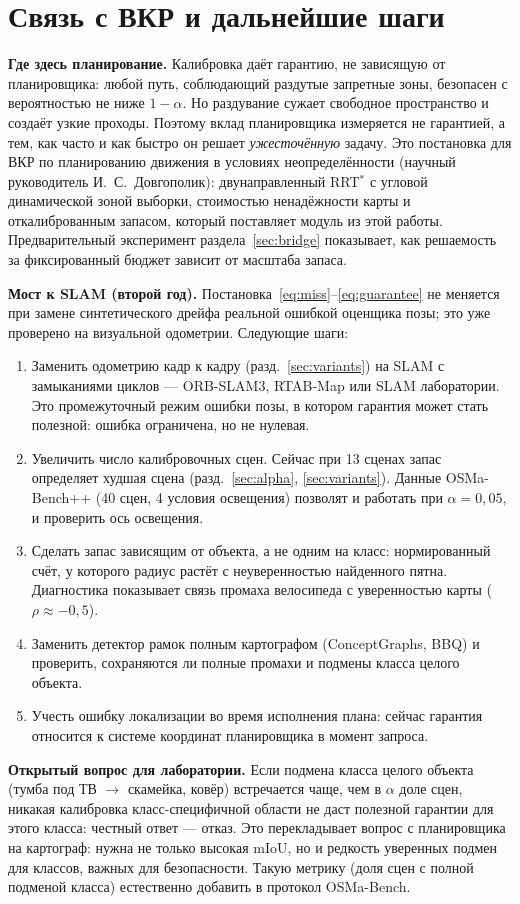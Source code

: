 \section{Связь с ВКР и дальнейшие шаги}

\textbf{Где здесь планирование.} Калибровка даёт гарантию, не зависящую от планировщика: любой путь, соблюдающий раздутые запретные зоны, безопасен с вероятностью не ниже $1-\alpha$. Но раздувание сужает свободное пространство и создаёт узкие проходы. Поэтому вклад планировщика измеряется не гарантией, а тем, как часто и как быстро он решает \emph{ужесточённую} задачу. Это постановка для ВКР по планированию движения в условиях неопределённости (научный руководитель И.~С.~Довгополик): двунаправленный RRT$^\ast$ с угловой динамической зоной выборки, стоимостью ненадёжности карты и откалиброванным запасом, который поставляет модуль из этой работы. Предварительный эксперимент раздела~\ref{sec:bridge} показывает, как решаемость за фиксированный бюджет зависит от масштаба запаса.

\textbf{Мост к SLAM (второй год).} Постановка~\eqref{eq:miss}--\eqref{eq:guarantee} не меняется при замене синтетического дрейфа реальной ошибкой оценщика позы; это уже проверено на визуальной одометрии. Следующие шаги:
\begin{enumerate}[nosep]
  \item Заменить одометрию кадр к кадру (разд.~\ref{sec:variants}) на SLAM с замыканиями циклов --- ORB-SLAM3, RTAB-Map или SLAM лаборатории. Это промежуточный режим ошибки позы, в котором гарантия может стать полезной: ошибка ограничена, но не нулевая.
  \item Увеличить число калибровочных сцен. Сейчас при 13 сценах запас определяет худшая сцена (разд.~\ref{sec:alpha}, \ref{sec:variants}). Данные OSMa-Bench++ (40 сцен, 4 условия освещения) позволят и работать при $\alpha = 0{,}05$, и проверить ось освещения.
  \item Сделать запас зависящим от объекта, а не одним на класс: нормированный счёт, у которого радиус растёт с неуверенностью найденного пятна. Диагностика показывает связь промаха велосипеда с уверенностью карты ($\rho \approx -0{,}5$).
  \item Заменить детектор рамок полным картографом (ConceptGraphs, BBQ) и проверить, сохраняются ли полные промахи и подмены класса целого объекта.
  \item Учесть ошибку локализации во время исполнения плана: сейчас гарантия относится к системе координат планировщика в момент запроса.
\end{enumerate}

\textbf{Открытый вопрос для лаборатории.} Если подмена класса целого объекта (тумба под ТВ $\to$ скамейка, ковёр) встречается чаще, чем в $\alpha$ доле сцен, никакая калибровка класс-специфичной области не даст полезной гарантии для этого класса: честный ответ --- отказ. Это перекладывает вопрос с планировщика на картограф: нужна не только высокая mIoU, но и редкость уверенных подмен для классов, важных для безопасности. Такую метрику (доля сцен с полной подменой класса) естественно добавить в протокол OSMa-Bench.
